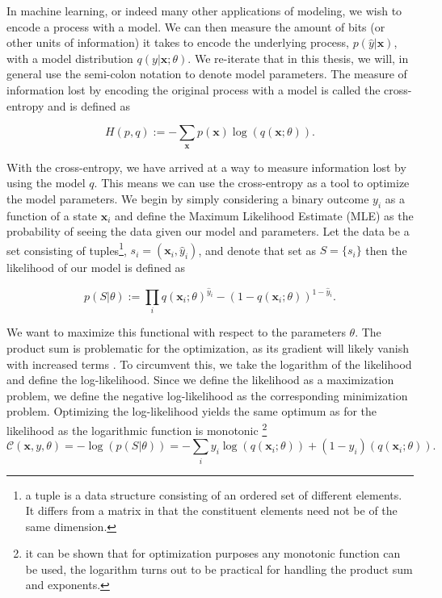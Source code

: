 In machine learning, or indeed many other applications of modeling, we wish to encode a process with a model. We can then measure the amount of bits (or other units of information) it takes to encode the underlying process, $p(\hat{y} | \boldsymbol{x})$, with a model distribution $q(y| \boldsymbol{x}; \theta)$. We re-iterate that in this thesis, we will, in general use the semi-colon notation to denote model parameters. The measure of information lost by encoding the original process with a model is called the cross-entropy and is defined as

\begin{equation}
H(p, q) := - \sum_{\boldsymbol{x}} p(\boldsymbol{x})\log(q(\boldsymbol{x}; \theta)).
\end{equation}

\noindent With the cross-entropy, we have arrived at a way to measure information lost by using the model $q$. This means we can use the cross-entropy as a tool to optimize the model parameters. We begin by simply considering a binary outcome $y_i$ as a function of a state $\boldsymbol{x}_i$ and define the Maximum Likelihood Estimate (MLE) as the probability of seeing the data given our model and parameters. Let the data be a set consisting of tuples\footnote{a tuple is a data structure consisting of an ordered set of different elements. It differs from a matrix in that the constituent elements need not be of the same dimension.}, $s_i = (\boldsymbol{x}_i, \hat{y}_i)$, and denote that set as $S = \{s_i\}$ then the likelihood of our model is defined as 

\begin{equation}\label{eq:likelihood}
p(S | \theta) := \prod_i q(\boldsymbol{x}_i; \theta)^{\hat{y}_i} - (1-q(\boldsymbol{x}_i; \theta))^{1-\hat{y}_i}.
\end{equation}

\noindent We want to maximize this functional with respect to the parameters $\theta$. The product sum is problematic for the optimization, as its gradient will likely vanish with increased terms . To circumvent this, we take the logarithm of the likelihood and define the log-likelihood. Since we define the likelihood as a maximization problem, we define the negative log-likelihood as the corresponding minimization problem. Optimizing the log-likelihood yields the same optimum as for the likelihood as the logarithmic function is monotonic \footnote{it can be shown that for optimization purposes any monotonic function can be used, the logarithm turns out to be practical for handling the product sum and exponents.}
\begin{equation}\label{eq:mle}
\mathcal{C}(\boldsymbol{x}, y, \theta) = -\log(p(S | \theta)) = -\sum_i y_i\log(q(\boldsymbol{x}_i; \theta)) + (1-y_i)(q(\boldsymbol{x}_i; \theta)).
\end{equation}

